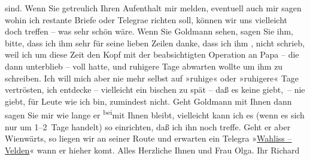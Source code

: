 \begin{ledgroupsized}[t]{13cm}
               sind.\pend
           \pstart
           {\pb}Wenn Sie getreulich Ihren
               Aufenthalt mir melden, eventuell auch mir sagen wohin ich restante Briefe oder
                  Telegra{\geminationm}e richten soll, können wir uns vielleicht doch treffen – was sehr schön wäre.\pend
           \pstart
           {\pb}Wenn Sie Goldmann sehen, sagen Sie ihm, bitte, dass ich ihm sehr für
               seine lieben Zeilen danke, dass ich ihm \label{K_L01701-1v}\label{K_L01701-1h}, nicht schrieb,
               weil ich um diese Zeit den Kopf mit der beabsichtigten Operation an Papa – die dann unterblieb – voll hatte, und
               ruhigere Tage abwarten wollte um ihm zu schreiben. Ich will mich aber nie mehr selbst
               auf »ruhige« oder »ruhigere« Tage vertrösten, ich {\pb}entdecke – vielleicht ein bischen
               zu spät – daß es keine giebt, – nie giebt, für Leute wie ich bin, zumindest
               nicht.\pend
           \pstart
           Geht Goldmann mit Ihnen dann sagen Sie mir wie
               lange er \substVorne{}\textsuperscript{bei}\substDazwischen{}mit\substHinten{} Ihnen bleibt, vielleicht kann ich es (wenn {\pb}es sich nur um 1–2 Tage handelt) so
               einrichten, daß ich ihn noch treffe. Geht er aber Wienwärts, so liegen wir an seiner Route und erwarten ein Telegra{\geminationm} »\uline{Wahliss – Velden}« wann
               er hieher ko{\geminationm}mt. Alles Herzliche Ihnen und Frau Olga.\pend
           \pstart Ihr \spacefill\mbox{Richard}\pend{}
         
         \endnumbering{}\end{ledgroupsized}  \newcommand{\dateiname}{L01701}\newcommand{\titel}{Richard Beer-Hofmann an Arthur Schnitzler, 23. 8. 1907}\newcommand{\editorInnen}{Martin Anton Müller und Gerd-Hermann Susen}
      